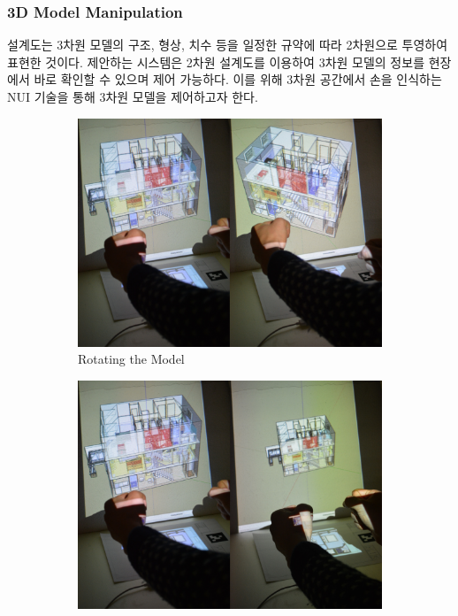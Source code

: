 \subsubsection{3D Model Manipulation}
설계도는 3차원 모델의 구조, 형상, 치수 등을 일정한 규약에 따라 2차원으로 투영하여 표현한 것이다. 제안하는 시스템은 2차원 설계도를 이용하여 3차원 모델의 정보를 현장에서 바로 확인할 수 있으며 제어 가능하다. 이를 위해 3차원 공간에서 손을 인식하는 NUI 기술을 통해 3차원 모델을 제어하고자 한다.
\begin{figure}[!ht]
	\centering
        \begin{subfigure}[b]{0.32\textwidth}
	        \centering
                \includegraphics[width=\textwidth]{4-Interaction_Design/3d_rotate}
                \caption{Rotating the Model}
                \label{fig:rotate}
        \end{subfigure}%
        \hfill
        \begin{subfigure}[b]{0.32\textwidth}
            \centering
            \includegraphics[width=\textwidth]{4-Interaction_Design/3d_scale_two_hand}

\end{subfigure}
\end{figure}
